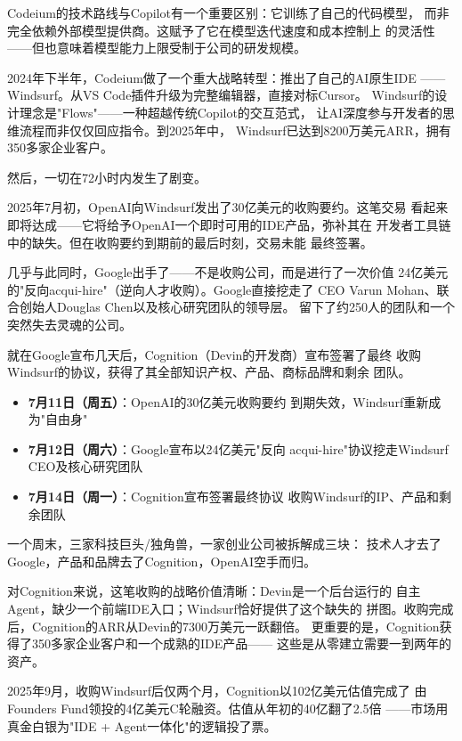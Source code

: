 Codeium的技术路线与Copilot有一个重要区别：它训练了自己的代码模型，
而非完全依赖外部模型提供商。这赋予了它在模型迭代速度和成本控制上
的灵活性——但也意味着模型能力上限受制于公司的研发规模。

2024年下半年，Codeium做了一个重大战略转型：推出了自己的AI原生IDE
——Windsurf。从VS Code插件升级为完整编辑器，直接对标Cursor。
Windsurf的设计理念是"Flows"——一种超越传统Copilot的交互范式，
让AI深度参与开发者的思维流程而非仅仅回应指令。到2025年中，
Windsurf已达到8200万美元ARR，拥有350多家企业客户。

然后，一切在72小时内发生了剧变。

2025年7月初，OpenAI向Windsurf发出了30亿美元的收购要约。这笔交易
看起来即将达成——它将给予OpenAI一个即时可用的IDE产品，弥补其在
开发者工具链中的缺失。但在收购要约到期前的最后时刻，交易未能
最终签署。

几乎与此同时，Google出手了——不是收购公司，而是进行了一次价值
24亿美元的"反向acqui-hire"（逆向人才收购）。Google直接挖走了
CEO Varun Mohan、联合创始人Douglas Chen以及核心研究团队的领导层。
留下了约250人的团队和一个突然失去灵魂的公司。

就在Google宣布几天后，Cognition（Devin的开发商）宣布签署了最终
收购Windsurf的协议，获得了其全部知识产权、产品、商标品牌和剩余
团队。

\begin{corebox}[Windsurf三日剧变的详细时间线]
\begin{itemize}
  \item \textbf{7月11日（周五）}：OpenAI的30亿美元收购要约
    到期失效，Windsurf重新成为"自由身"
  \item \textbf{7月12日（周六）}：Google宣布以24亿美元"反向
    acqui-hire"协议挖走Windsurf CEO及核心研究团队
  \item \textbf{7月14日（周一）}：Cognition宣布签署最终协议
    收购Windsurf的IP、产品和剩余团队
\end{itemize}
一个周末，三家科技巨头/独角兽，一家创业公司被拆解成三块：
技术人才去了Google，产品和品牌去了Cognition，OpenAI空手而归。
\end{corebox}

对Cognition来说，这笔收购的战略价值清晰：Devin是一个后台运行的
自主Agent，缺少一个前端IDE入口；Windsurf恰好提供了这个缺失的
拼图。收购完成后，Cognition的ARR从Devin的7300万美元一跃翻倍。
更重要的是，Cognition获得了350多家企业客户和一个成熟的IDE产品——
这些是从零建立需要一到两年的资产。

2025年9月，收购Windsurf后仅两个月，Cognition以102亿美元估值完成了
由Founders Fund领投的4亿美元C轮融资。估值从年初的40亿翻了2.5倍
——市场用真金白银为"IDE + Agent一体化"的逻辑投了票。


